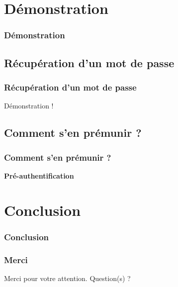 \documentclass[svgnames]{beamer}
\begin{document}
\section{Démonstration}

\begin{frame}
  \frametitle{Démonstration}
\end{frame}

\subsection{Récupération d'un mot de passe}
\begin{frame}
 \frametitle{Récupération d'un mot de passe}
 
 \begin{center}
  Démonstration !
 \end{center}
\end{frame}


\subsection{Comment s'en prémunir ?}

\begin{frame}
 \frametitle{Comment s'en prémunir ?}
 
 \textbf{Pré-authentification}
\end{frame}


\section*{Conclusion}
\begin{frame}
  \frametitle{Conclusion}
  
  

\end{frame}


\begin{frame}
  \frametitle{Merci}
  \begin{center}
    Merci pour votre attention. Question(s) ?
  \end{center}
\end{frame}
\end{document}

